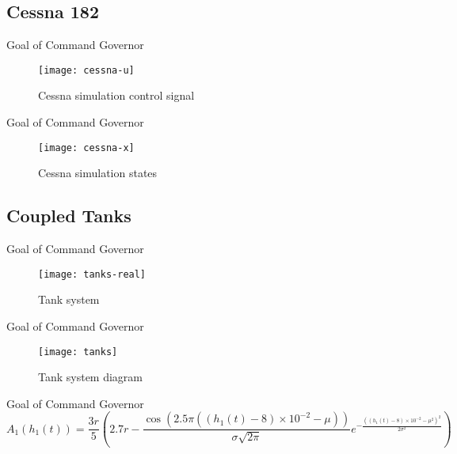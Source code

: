 \subsection{Cessna 182}%
\label{subsec:cessna}

\begin{slide}{Goal of Command Governor}
  \begin{figure}[ht!]
    \centering \captionsetup{justification=centering}
    \texttt{[image: cessna-u]}
    \caption{Cessna simulation control signal}%
    \label{fig:cessna-u}
  \end{figure}
\end{slide}

\begin{slide}{Goal of Command Governor}
  \begin{figure}[ht!]
    \centering \captionsetup{justification=centering}
    \texttt{[image: cessna-x]}
    \caption{Cessna simulation states}%
    \label{fig:cessna-x}
  \end{figure}
\end{slide}

\subsection{Coupled Tanks}%
\label{subsec:tanks}

\begin{slide}{Goal of Command Governor}
  \begin{figure}[ht!]
    \centering \captionsetup{justification=centering}
    \texttt{[image: tanks-real]}
    \caption{Tank system}%
    \label{fig:tanks-real}
  \end{figure}
\end{slide}

\begin{slide}{Goal of Command Governor}
  \begin{figure}[ht!]
    \centering \captionsetup{justification=centering}
    \texttt{[image: tanks]}
    \caption{Tank system diagram}%
    \label{fig:tanks}
  \end{figure}
\end{slide}

\begin{slide}{Goal of Command Governor}
  \begin{equation}
    \label{eq:t1-area}
    A_{1}(h_{1}(t)) = \frac{3r}{5} \left(
    2.7r - \frac{\cos(2.5\pi{}((h_{1}(t)-8)\times{}10^{-2}-\mu))}{\sigma{}\sqrt{2\pi}}
    e^{-\frac{((h_{1}(t)-8)\times{}10^{-2}-\mu^{2})^{2}}{2\sigma^{2}}}
    \right)
  \end{equation}
\end{slide}

